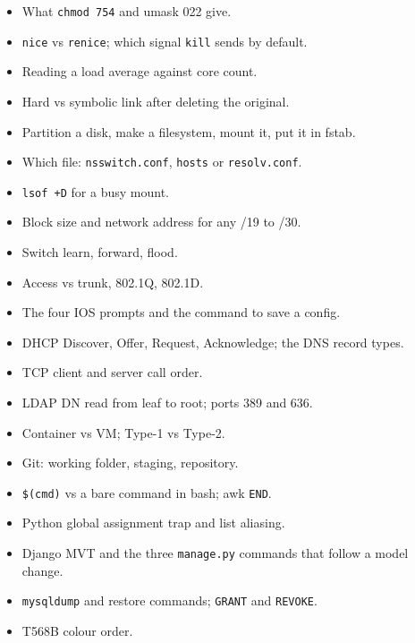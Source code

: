 \documentclass[11pt,a4paper]{article}
\begin{document}
\begin{itemize}
\item[$\square$] What \texttt{chmod 754} and umask 022 give.
\item[$\square$] \texttt{nice} vs \texttt{renice}; which signal \texttt{kill} sends by default.
\item[$\square$] Reading a load average against core count.
\item[$\square$] Hard vs symbolic link after deleting the original.
\item[$\square$] Partition a disk, make a filesystem, mount it, put it in fstab.
\item[$\square$] Which file: \texttt{nsswitch.conf}, \texttt{hosts} or \texttt{resolv.conf}.
\item[$\square$] \texttt{lsof +D} for a busy mount.
\item[$\square$] Block size and network address for any /19 to /30.
\item[$\square$] Switch learn, forward, flood.
\item[$\square$] Access vs trunk, 802.1Q, 802.1D.
\item[$\square$] The four IOS prompts and the command to save a config.
\item[$\square$] DHCP Discover, Offer, Request, Acknowledge; the DNS record types.
\item[$\square$] TCP client and server call order.
\item[$\square$] LDAP DN read from leaf to root; ports 389 and 636.
\item[$\square$] Container vs VM; Type-1 vs Type-2.
\item[$\square$] Git: working folder, staging, repository.
\item[$\square$] \texttt{\$(cmd)} vs a bare command in bash; awk \texttt{END}.
\item[$\square$] Python global assignment trap and list aliasing.
\item[$\square$] Django MVT and the three \texttt{manage.py} commands that follow a model change.
\item[$\square$] \texttt{mysqldump} and restore commands; \texttt{GRANT} and \texttt{REVOKE}.
\item[$\square$] T568B colour order.
\end{itemize}
\end{document}

